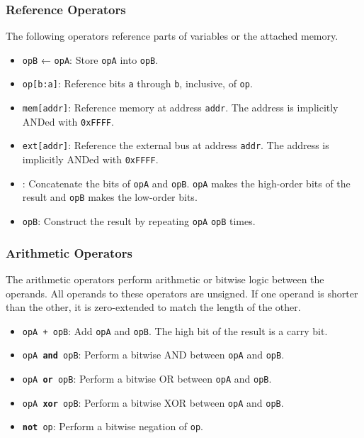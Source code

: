 \documentclass[12pt,a4paper]{article}
\begin{document}
\subsubsection{Reference Operators}
The following operators reference parts of variables or the attached memory.

\begin{itemize}
  \item \texttt{opB} ← \texttt{opA}: Store \texttt{opA} into \texttt{opB}.
  \item \texttt{op[b:a]}: Reference bits \texttt{a} through \texttt{b}, inclusive, of \texttt{op}.
  \item \texttt{mem[addr]}: Reference memory at address \texttt{addr}. The address is implicitly ANDed with \texttt{0xFFFF}.
  \item \texttt{ext[addr]}: Reference the external bus at address \texttt{addr}. The address is implicitly ANDed with \texttt{0xFFFF}.
  \item \texttt{}: Concatenate the bits of \texttt{opA} and \texttt{opB}. \texttt{opA} makes the high-order bits of the result and \texttt{opB} makes the low-order bits.
  \item \texttt{opB}: Construct the result by repeating \texttt{opA} \texttt{opB} times.
\end{itemize}

\subsubsection{Arithmetic Operators}
The arithmetic operators perform arithmetic or bitwise logic between the operands. All operands to these operators are unsigned. If one operand is shorter than the other, it is zero-extended to match the length of the other.

\begin{itemize}
  \item \texttt{opA + opB}: Add \texttt{opA} and \texttt{opB}. The high bit of the result is a carry bit.
  \item \texttt{opA \textbf{and} opB}: Perform a bitwise AND between \texttt{opA} and \texttt{opB}.
  \item \texttt{opA \textbf{or} opB}: Perform a bitwise OR between \texttt{opA} and \texttt{opB}.
  \item \texttt{opA \textbf{xor} opB}: Perform a bitwise XOR between \texttt{opA} and \texttt{opB}.
  \item \texttt{\textbf{not} op}: Perform a bitwise negation of \texttt{op}.
\end{itemize}
\end{document}
